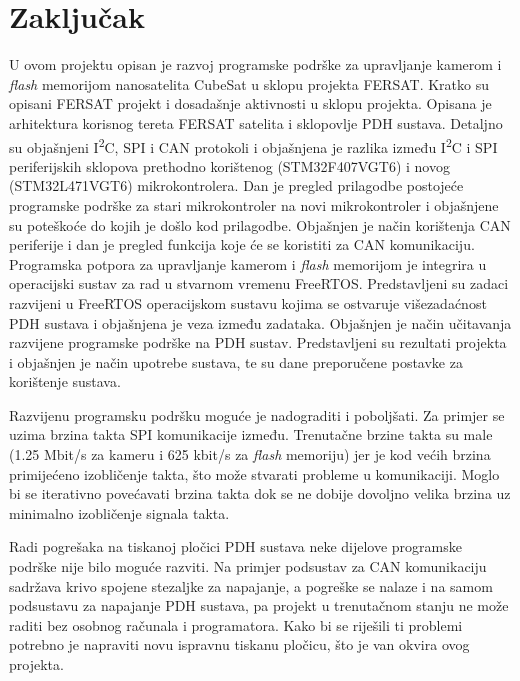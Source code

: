 \chapter{Zaključak}

U ovom projektu opisan je razvoj programske podrške za upravljanje kamerom i \textit{flash} memorijom nanosatelita CubeSat u sklopu projekta FERSAT. Kratko su opisani FERSAT projekt i dosadašnje aktivnosti u sklopu projekta. Opisana je arhitektura korisnog tereta FERSAT satelita i sklopovlje PDH sustava. Detaljno su objašnjeni I\textsuperscript{2}C, SPI i CAN protokoli i objašnjena je razlika između I\textsuperscript{2}C i SPI periferijskih sklopova prethodno korištenog (STM32F407VGT6) i novog (STM32L471VGT6) mikrokontrolera. Dan je pregled prilagodbe postojeće programske podrške za stari mikrokontroler na novi mikrokontroler i objašnjene su poteškoće do kojih je došlo kod prilagodbe. Objašnjen je način korištenja CAN periferije i dan je pregled funkcija koje će se koristiti za CAN komunikaciju. Programska potpora za upravljanje kamerom i \textit{flash} memorijom je integrira u operacijski sustav za rad u stvarnom vremenu FreeRTOS. Predstavljeni su zadaci razvijeni u FreeRTOS operacijskom sustavu kojima se ostvaruje višezadaćnost PDH sustava i objašnjena je veza između zadataka. Objašnjen je način učitavanja razvijene programske podrške na PDH sustav. Predstavljeni su rezultati projekta i objašnjen je način upotrebe sustava, te su dane preporučene postavke za korištenje sustava.

Razvijenu programsku podršku moguće je nadograditi i poboljšati. Za primjer se uzima brzina takta SPI komunikacije između. Trenutačne brzine takta su male (1.25 Mbit/s za kameru i 625 kbit/s za \textit{flash} memoriju) jer je kod većih brzina primijećeno izobličenje takta, što može stvarati probleme u komunikaciji. Moglo bi se iterativno povećavati brzina takta dok se ne dobije dovoljno velika brzina uz minimalno izobličenje signala takta.

Radi pogrešaka na tiskanoj pločici PDH sustava neke dijelove programske podrške nije bilo moguće razviti. Na primjer podsustav za CAN komunikaciju sadržava krivo spojene stezaljke za napajanje, a pogreške se nalaze i na samom podsustavu za napajanje PDH sustava, pa projekt u trenutačnom stanju ne može raditi bez osobnog računala i programatora. Kako bi se riješili ti problemi potrebno je napraviti novu ispravnu tiskanu pločicu, što je van okvira ovog projekta.